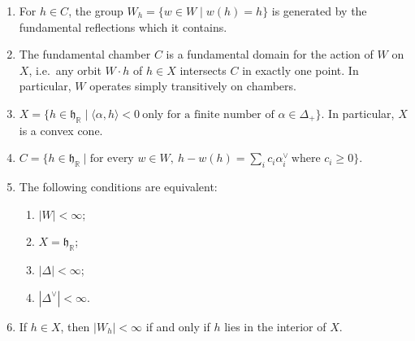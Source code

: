 \documentclass[12pt]{article}
\begin{document}
\begin{proposition}[Geometry of $W$]\label{prop:geometry-of-W}
    \leavevmode
    \begin{enumerate}[label=(\alph*)]
        \item For $h \in C$, the group $W_h = \{ w \in W \mid w(h) = h \}$
              is generated by the fundamental reflections which it contains.

        \item The fundamental chamber $C$ is a fundamental domain for the action of $W$ on $X$,
              i.e.\ any orbit $W\cdot h$ of $h \in X$ intersects $C$ in exactly one point.
              In particular, $W$ operates simply transitively on chambers.

        \item $X = \{ h \in \mathfrak{h}_{\mathbb{R}} \mid \langle \alpha,h \rangle < 0 \
                  \text{only for a finite number of } \alpha \in \Delta_+ \}$.
              In particular, $X$ is a convex cone.

        \item $C = \{ h \in \mathfrak{h}_{\mathbb{R}} \mid \text{for every } w \in W,\
                  h-w(h) = \sum_i c_i \alpha_i^\vee \ \text{where } c_i \geq 0 \}$.

        \item The following conditions are equivalent:
              \begin{enumerate}[label=(\roman*)]
                  \item $|W| < \infty$;
                  \item $X = \mathfrak{h}_{\mathbb{R}}$;
                  \item $|\Delta| < \infty$;
                  \item $|\Delta^\vee| < \infty$.
              \end{enumerate}

        \item If $h \in X$, then $|W_h| < \infty$ if and only if $h$ lies in the interior of $X$.
    \end{enumerate}
\end{proposition}
\end{document}
